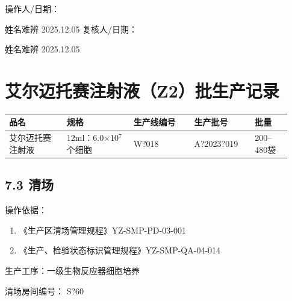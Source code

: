 \documentclass[UTF8,10pt,a4paper,fontset=fandol]{ctexart}
\newcommand{\fieldvalue}[1]{#1}
\newcommand{\handwritten}[1]{#1}
\begin{document}
\vspace{0.5em}

操作人/日期：

\fieldvalue{\handwritten{姓名难辨}}\quad
\fieldvalue{\handwritten{2025.12.05}}
\hfill
复核人/日期：

\fieldvalue{\handwritten{姓名难辨}}\quad
\fieldvalue{\handwritten{2025.12.05}}

\newpage

\section*{艾尔迈托赛注射液（Z2）批生产记录}

\begin{tabular}{|p{0.19\linewidth}|p{0.22\linewidth}|p{0.20\linewidth}|p{0.20\linewidth}|p{0.12\linewidth}|}
\hline
品名 & 规格 & 生产线编号 & 生产批号 & 批量 \\
\hline
艾尔迈托赛注射液 & 12ml：6.0$\times$10$^{7}$个细胞 &
\fieldvalue{\handwritten{W?018}} &
\fieldvalue{\handwritten{A?2023?019}} &
200--480袋 \\
\hline
\end{tabular}

\subsection*{7.3 清场}

操作依据：

\begin{enumerate}
    \item 《生产区清场管理规程》\hfill YZ-SMP-PD-03-001
    \item 《生产、检验状态标识管理规程》\hfill YZ-SMP-QA-04-014
\end{enumerate}

生产工序：一级生物反应器细胞培养

清场房间编号：
\fieldvalue{\handwritten{S?60}}
\end{document}
